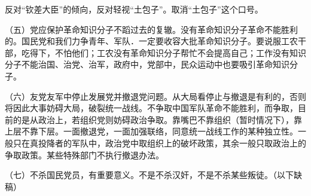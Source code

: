 反对“钦差大臣”的倾向，反对轻视“土包子”。取消“土包子”这个口号。

（五）党应保护革命知识分子不蹈过去的复辙。没有革命知识分子革命不能胜利的。国民党和我们力争青年、军队．一定要收容大批革命知识分子。要说服工农干部，吃得下，不怕他们；工农没有革命知识分子帮忙不会提高自己；工作没有知识分子不能治国、治党、治军，政府中，党部中，民众运动中也要吸引革命知识分子。

（六）友党友军中停止发展党并撤退党问题。从大局看停止与撤退是有利的，否则将因此大事妨碍大局，破裂统一战线。不争取中国军队革命不能胜利，而争取，目前的是从政治上，若组织党则妨碍政治争取。靠嘴巴不靠组织（暂时情况下），靠上层不靠下层。一面撤退党，一面加强联络，同意统一战线工作的某种独立性。一般只在真投降者的军队中，政治党中取组织上的破坏政策，其余一般只取政治上的争取政策。某些特殊部门不执行撤退办法。

（七）不杀国民党员，有重要意义。不是不杀汉奸，不是不杀某些叛徒。（以下缺稿）


